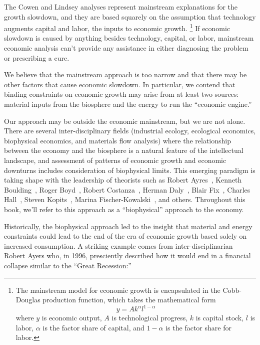 The Cowen and Lindsey analyses represent mainstream explanations for the growth slowdown,
and they are based squarely on the assumption that technology augments 
capital and labor, the inputs to economic growth.%
	\footnote{
	The mainstream model for economic growth is encapsulated in the
	Cobb-Douglas production function, which takes the mathematical form
	\begin{equation*}
		y = A k^{\alpha} l^{1-\alpha}
	\end{equation*}	 
	where 
	$y$ is economic output, 
	$A$ is technological progress,
	$k$ is capital stock, 
	$l$ is labor, 
	$\alpha$ is the factor share of capital, and
	$1-\alpha$ is the factor share for labor.
	}
If economic slowdown is caused by anything besides
technology, capital, or labor,
mainstream economic analysis can't provide any assistance
in either diagnosing the problem or prescribing a cure.

We believe that the mainstream approach is too narrow and
that there may be other factors that cause economic slowdown.
In particular,  
we contend that binding constraints on economic growth may arise from
at least two sources: 
material inputs from the biosphere and 
the energy to run the ``economic engine.''

Our approach may be outside the economic mainstream,
but we are not alone. 
There are several inter-disciplinary fields 
(industrial ecology, ecological economics, biophysical economics, and
materials flow analysis)
where the relationship between the 
economy and the biosphere is a natural feature of the intellectual landscape,
and assessment of patterns of economic growth and economic downturns  
includes consideration of biophysical limits. 
This emerging paradigm is taking shape with the leadership of theorists
such as 
Robert Ayres~\cite{Ayres:2010ug}, 
Kenneth Boulding~\cite{Boulding1966}, 
Roger Boyd~\cite{boyd2013energy},
Robert Costanza~\cite{Cleveland:1984aa}, 
Herman Daly~\cite{Daly1977}, 
Blair Fix~\cite{Fix:2014aa},
Charles Hall~\cite{hall2011energy}, 
Steven Kopits~\cite{Kopits:2009aa},
Marina Fischer-Kowalski~\cite{F-K1999},
and others.
Throughout this book, we'll refer to this approach as a ``biophysical'' approach
to the economy.

Historically, the biophysical approach led to the insight 
that material and energy constraints could lead to the 
end of the era of economic growth based solely on increased
consumption.
A striking example comes from 
inter-disciplinarian Robert Ayers who, in 1996, presciently described 
how it would end in a financial collapse similar to the ``Great Recession:''

